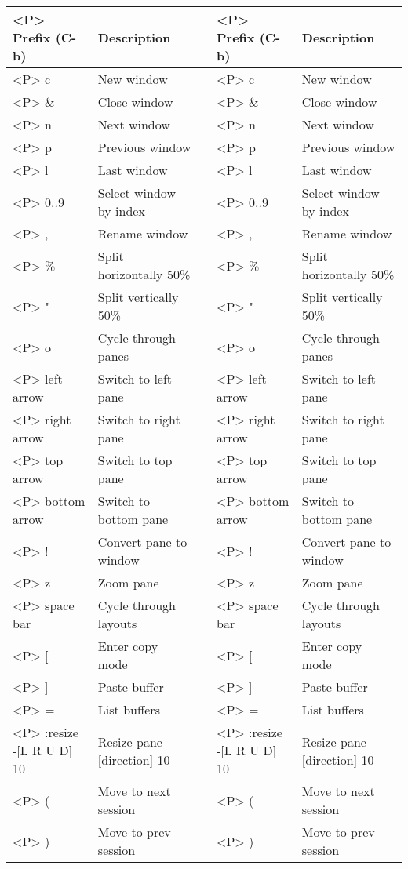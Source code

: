 \documentclass[11pt]{article}
\author{mla}
\date{\today}
\title{}
\begin{document}
\hfill \break
\begin{tabular}{lllll}
\hline
<P> Prefix (C-b) & Description &  & <P> Prefix (C-b) & Description\\
\hline
<P> c & New window &  & <P> c & New window\\
<P> \& & Close window &  & <P> \& & Close window\\
<P> n & Next window &  & <P> n & Next window\\
<P> p & Previous window &  & <P> p & Previous window\\
<P> l & Last window &  & <P> l & Last window\\
<P> 0..9 & Select window by index &  & <P> 0..9 & Select window by index\\
<P> , & Rename window &  & <P> , & Rename window\\
<P> \% & Split horizontally 50\% &  & <P> \% & Split horizontally 50\%\\
<P> " & Split vertically 50\% &  & <P> " & Split vertically 50\%\\
<P> o & Cycle through panes &  & <P> o & Cycle through panes\\
<P> left arrow & Switch to left pane &  & <P> left arrow & Switch to left pane\\
<P> right arrow & Switch to right pane &  & <P> right arrow & Switch to right pane\\
<P> top arrow & Switch to top pane &  & <P> top arrow & Switch to top pane\\
<P> bottom arrow & Switch to bottom pane &  & <P> bottom arrow & Switch to bottom pane\\
<P> ! & Convert pane to window &  & <P> ! & Convert pane to window\\
<P> z & Zoom pane &  & <P> z & Zoom pane\\
<P> space bar & Cycle through layouts &  & <P> space bar & Cycle through layouts\\
<P> [ & Enter copy mode &  & <P> [ & Enter copy mode\\
<P> ] & Paste buffer &  & <P> ] & Paste buffer\\
<P> = & List buffers &  & <P> = & List buffers\\
<P> :resize -[L R U D] 10 & Resize pane [direction] 10 &  & <P> :resize -[L R U D] 10 & Resize pane [direction] 10\\
<P> ( & Move to next session &  & <P> ( & Move to next session\\
<P> ) & Move to prev session &  & <P> ) & Move to prev session\\

\end{tabular}
\end{document}
